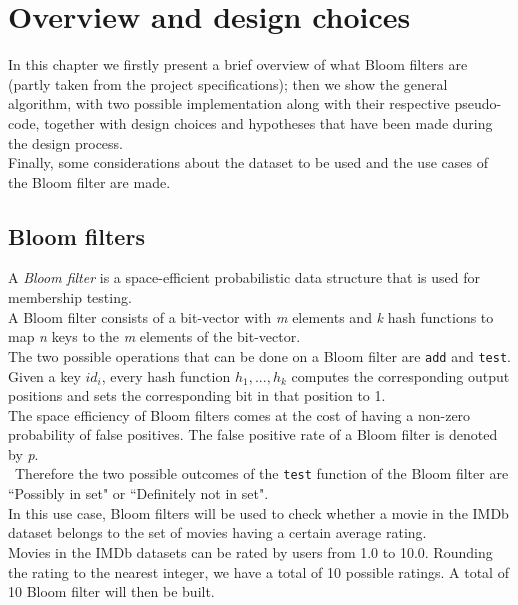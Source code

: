 %       
%
\chapter{Overview and design choices}\label{ch:design}
In this chapter we firstly present a brief overview of what Bloom filters are (partly taken from the project specifications); then we show the general algorithm, with two possible implementation along with their respective pseudo-code, together with design choices and hypotheses that have been made during the design process.\\
Finally, some considerations about the dataset to be used and the use cases of the Bloom filter are made.\\

\section{Bloom filters}
A \textit{Bloom filter} is a space-efficient probabilistic data structure that is used for membership testing.\\
A Bloom filter consists of a bit-vector with \textit{m} elements and \textit{k} hash functions to map \textit{n} keys to the \textit{m} elements of the bit-vector.\\
The two possible operations that can be done on a Bloom filter are \texttt{add} and \texttt{test}.\\
Given a key \textit{$id_{i}$}, every hash function \textit{$h_{1}, ..., h_{k}$} computes the corresponding output positions and sets the corresponding bit in that position to 1.\\
The space efficiency of Bloom filters comes at the cost of having a non-zero probability of false positives. The false positive rate of a Bloom filter is denoted by \textit{p}.\\\
Therefore the two possible outcomes of the \texttt{test} function of the Bloom filter are ``Possibly in set" or ``Definitely not in set".\\

In this use case, Bloom filters will be used to check whether a movie in the IMDb dataset belongs to the set of movies having a certain average rating.\\
Movies in the IMDb datasets can be rated by users from 1.0 to 10.0. Rounding the rating to the nearest integer, we have a total of 10 possible ratings.
A total of 10 Bloom filter will then be built.

